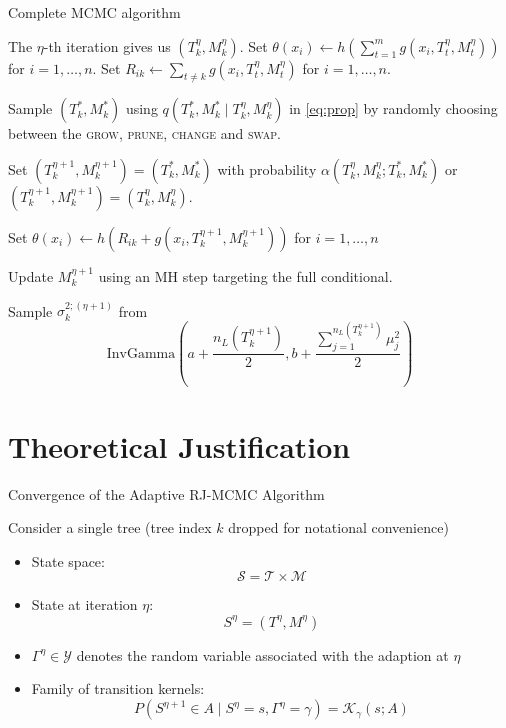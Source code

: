 \documentclass[11pt]{beamer}
\begin{document}
    \begin{frame}{Complete MCMC algorithm}
    \centering
{        \begin{algorithm}[H]
\tiny
	\caption{One iteration of RJ-MCMC for copula BART}\label{alg:MCMC}
	\begin{algorithmic}[1]
		\State The $\eta$-th iteration gives us $(T_k^{\eta},M_k^{\eta})$.
		\State Set $\theta(x_i) \leftarrow h\left(\sum_{t=1}^{m} g(x_i, T_t^{\eta},M_t^{\eta})\right)$ for $i = 1, \ldots, n$.
		\State Set $R_{ik} \leftarrow \sum_{t\not=k}g(x_i, T_t^{\eta},M_t^{\eta})$ for $i = 1, \ldots, n$.
		
		\State Sample $(T_k^\ast, M_k^\ast)$ using $q\left(T_k^\ast, M_k^\ast \mid T_k^{\eta},M_k^{\eta}\right)$ in \cref{eq:prop} by randomly choosing between the \textsc{grow}, \textsc{prune}, \textsc{change} and \textsc{swap}.
		
		\State Set $\left(T_k^{\eta+1}, M_k^{\eta+1}\right)=\left(T_k^\ast, M_k^\ast\right)$ with probability $\alpha\left(T_k^{\eta},M_k^{\eta};T_k^\ast, M_k^\ast\right)$ or $\left(T_k^{\eta+1}, M_k^{\eta+1}\right)=\left(T_k^{\eta},M_k^{\eta}\right)$.
		
		\State Set $\theta(x_i) \leftarrow h\left(R_{ik} + g\left(x_i, T_k^{\eta+1}, M_k^{\eta+1}\right)\right)$ for $i = 1, \ldots, n$
		
		\State Update $M_k^{\eta+1}$ using an MH step targeting the full conditional.
		
		\State Sample $\sigma_{k}^{2;(\eta+1)}$ from 
		\begin{equation*}
			\text{InvGamma}\left(a+\frac{n_L\left(T_k^{\eta+1}\right)}{2} , b + \frac{\sum_{j=1}^{n_L\left(T_k^{\eta+1}\right)}\mu_j^2}{2}\right)
		\end{equation*}
		\EndFor
	\end{algorithmic}
\end{algorithm}
}
    \end{frame}

\section{Theoretical Justification}

\begin{frame}{Convergence of the Adaptive RJ-MCMC Algorithm}

Consider a single tree (tree index $k$ dropped for notational convenience)
\begin{itemize}
    \item State space:
    \[
        \mathcal{S} = \mathcal{T} \times \mathcal{M}
    \]
    \item State at iteration $\eta$:
    \[
        S^{\eta} = (T^{\eta}, M^{\eta})
    \]
    \item $\Gamma^{\eta} \in \mathcal{Y}$ denotes the random variable associated with the adaption at $\eta$
    
    \item Family of transition kernels:
    \[
        P(S^{\eta+1} \in A \mid S^{\eta}=s, \Gamma^{\eta}=\gamma)
        = \mathcal{K}_{\gamma}(s;A)
    \]
\end{itemize}
\end{frame}
\end{document}
